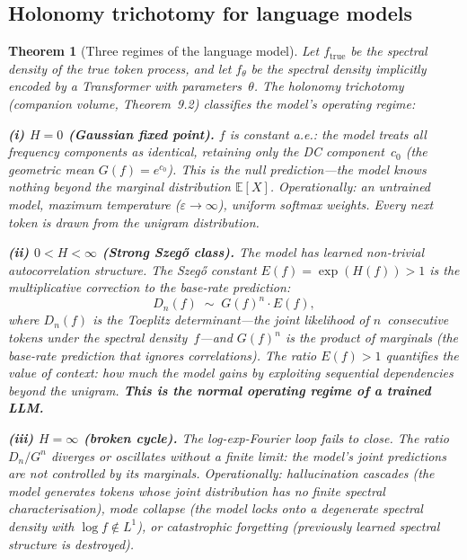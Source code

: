 \documentclass[11pt,a4paper]{article}
\newtheorem{theorem}{Theorem}[section]
\theoremstyle{definition}
\theoremstyle{remark}
\begin{document}
\subsection*{Holonomy trichotomy for language models}

\begin{theorem}[Three regimes of the language model]
\label{thm:llm-trichotomy}
Let $f_{\mathrm{true}}$ be the spectral density of the true token
process, and let $f_\theta$ be the spectral density implicitly
encoded by a Transformer with parameters~$\theta$.
The holonomy trichotomy (companion volume, Theorem~9.2) classifies
the model's operating regime:

\medskip
\noindent\textbf{(i) $H = 0$ (Gaussian fixed point).}
$f$ is constant a.e.: the model treats all frequency components
as identical, retaining only the DC component~$c_0$
(the geometric mean $G(f) = e^{c_0}$).
This is the \emph{null prediction}---the model knows nothing
beyond the marginal distribution $\mathbb{E}[X]$.
Operationally: an untrained model, maximum temperature
($\varepsilon \to \infty$), uniform softmax weights.
Every next token is drawn from the unigram distribution.

\medskip
\noindent\textbf{(ii) $0 < H < \infty$
(Strong Szeg\H{o} class).}
The model has learned non-trivial autocorrelation structure.
The Szeg\H{o} constant $E(f) = \exp(H(f)) > 1$ is the
multiplicative correction to the base-rate prediction:
\[
  D_n(f) \;\sim\; G(f)^n \cdot E(f),
\]
where $D_n(f)$ is the Toeplitz determinant---the joint likelihood
of $n$~consecutive tokens under the spectral density~$f$---and
$G(f)^n$ is the product of marginals (the base-rate prediction
that ignores correlations).
The ratio $E(f) > 1$ quantifies the \emph{value of context}:
how much the model gains by exploiting sequential dependencies
beyond the unigram.
\textbf{This is the normal operating regime of a trained LLM.}

\medskip
\noindent\textbf{(iii) $H = \infty$ (broken cycle).}
The log-exp-Fourier loop fails to close.
The ratio $D_n / G^n$ diverges or oscillates without a finite
limit: the model's joint predictions are not controlled by its
marginals.
Operationally: hallucination cascades (the model generates
tokens whose joint distribution has no finite spectral
characterisation), mode collapse (the model locks onto a
degenerate spectral density with $\log f \notin L^1$),
or catastrophic forgetting (previously learned spectral
structure is destroyed).
\end{theorem}
\end{document}
